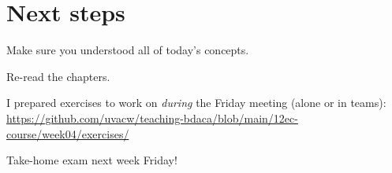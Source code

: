 \documentclass[compress]{beamer}
\begin{document}

\section{Next steps}

\begin{frame}[standout]
Make sure you understood all of today's concepts.

Re-read the chapters.

I prepared exercises to work on \emph{during} the Friday meeting (alone or in teams):
\large{\url{https://github.com/uvacw/teaching-bdaca/blob/main/12ec-course/week04/exercises/}}
\end{frame}


\begin{frame}[standout]
Take-home exam next week Friday!
\end{frame}





\begin{frame}
	\printbibliography
\end{frame}
\end{document}
